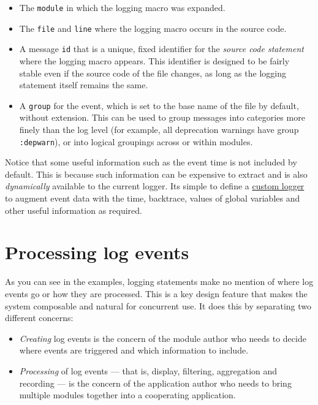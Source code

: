 \begin{itemize}
\item The \texttt{module} in which the logging macro was expanded.


\item The \texttt{file} and \texttt{line} where the logging macro occurs in the source code.


\item A message \texttt{id} that is a unique, fixed identifier for the \emph{source code statement} where the logging macro appears. This identifier is designed to be fairly stable even if the source code of the file changes, as long as the logging statement itself remains the same.


\item A \texttt{group} for the event, which is set to the base name of the file by default, without extension.  This can be used to group messages into categories more finely than the log level (for example, all deprecation warnings have group \texttt{:depwarn}), or into logical groupings across or within modules.

\end{itemize}


Notice that some useful information such as the event time is not included by default. This is because such information can be expensive to extract and is also \emph{dynamically} available to the current logger. It{\textquotesingle}s simple to define a \hyperlink{8132992094414010061}{custom logger} to augment event data with the time, backtrace, values of global variables and other useful information as required.



\hypertarget{1246485954867051804}{}


\section{Processing log events}



As you can see in the examples, logging statements make no mention of where log events go or how they are processed. This is a key design feature that makes the system composable and natural for concurrent use. It does this by separating two different concerns:



\begin{itemize}
\item \emph{Creating} log events is the concern of the module author who needs to decide where events are triggered and which information to include.


\item \emph{Processing} of log events — that is, display, filtering, aggregation and recording — is the concern of the application author who needs to bring multiple modules together into a cooperating application.

\end{itemize}



